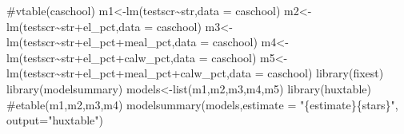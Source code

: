 \documentclass[
  letterpaper,
  DIV=11,
  numbers=noendperiod]{scrartcl}
\newenvironment{Shaded}{\begin{snugshade}}{\end{snugshade}}
\newcommand{\AttributeTok}[1]{\textcolor[rgb]{0.56,0.74,0.73}{#1}}
\newcommand{\CommentTok}[1]{\textcolor[rgb]{0.38,0.43,0.53}{#1}}
\newcommand{\FunctionTok}[1]{\textcolor[rgb]{0.53,0.75,0.82}{#1}}
\newcommand{\NormalTok}[1]{\textcolor[rgb]{0.85,0.87,0.91}{#1}}
\newcommand{\OtherTok}[1]{\textcolor[rgb]{0.56,0.74,0.73}{#1}}
\newcommand{\SpecialCharTok}[1]{\textcolor[rgb]{0.92,0.80,0.55}{#1}}
\newcommand{\StringTok}[1]{\textcolor[rgb]{0.64,0.75,0.55}{#1}}
\begin{document}
\begin{Shaded}
\begin{Highlighting}[]
\CommentTok{\#vtable(caschool)}
\NormalTok{m1}\OtherTok{\textless{}{-}}\FunctionTok{lm}\NormalTok{(testscr}\SpecialCharTok{\textasciitilde{}}\NormalTok{str,}\AttributeTok{data =}\NormalTok{ caschool)}
\NormalTok{m2}\OtherTok{\textless{}{-}}\FunctionTok{lm}\NormalTok{(testscr}\SpecialCharTok{\textasciitilde{}}\NormalTok{str}\SpecialCharTok{+}\NormalTok{el\_pct,}\AttributeTok{data =}\NormalTok{ caschool)}
\NormalTok{m3}\OtherTok{\textless{}{-}}\FunctionTok{lm}\NormalTok{(testscr}\SpecialCharTok{\textasciitilde{}}\NormalTok{str}\SpecialCharTok{+}\NormalTok{el\_pct}\SpecialCharTok{+}\NormalTok{meal\_pct,}\AttributeTok{data =}\NormalTok{ caschool)}
\NormalTok{m4}\OtherTok{\textless{}{-}}\FunctionTok{lm}\NormalTok{(testscr}\SpecialCharTok{\textasciitilde{}}\NormalTok{str}\SpecialCharTok{+}\NormalTok{el\_pct}\SpecialCharTok{+}\NormalTok{calw\_pct,}\AttributeTok{data =}\NormalTok{ caschool)}
\NormalTok{m5}\OtherTok{\textless{}{-}}\FunctionTok{lm}\NormalTok{(testscr}\SpecialCharTok{\textasciitilde{}}\NormalTok{str}\SpecialCharTok{+}\NormalTok{el\_pct}\SpecialCharTok{+}\NormalTok{meal\_pct}\SpecialCharTok{+}\NormalTok{calw\_pct,}\AttributeTok{data =}\NormalTok{ caschool)}
\FunctionTok{library}\NormalTok{(fixest)}
\FunctionTok{library}\NormalTok{(modelsummary)}
\NormalTok{models}\OtherTok{\textless{}{-}}\FunctionTok{list}\NormalTok{(m1,m2,m3,m4,m5)}
\FunctionTok{library}\NormalTok{(huxtable)}
\CommentTok{\#etable(m1,m2,m3,m4)}
\FunctionTok{modelsummary}\NormalTok{(models,}\AttributeTok{estimate =} \StringTok{"\{estimate\}\{stars\}"}\NormalTok{, }\AttributeTok{output=}\StringTok{"huxtable"}\NormalTok{)}
\end{Highlighting}
\end{Shaded}

 
  \providecommand{\huxb}[2]{\arrayrulecolor[RGB]{#1}\global\arrayrulewidth=#2pt}
  \providecommand{\huxvb}[2]{\color[RGB]{#1}\vrule width #2pt}
  \providecommand{\huxtpad}[1]{\rule{0pt}{#1}}
  \providecommand{\huxbpad}[1]{\rule[-#1]{0pt}{#1}}
\end{document}
